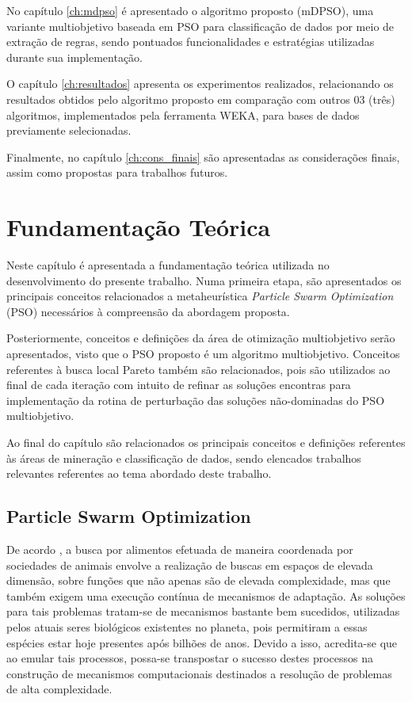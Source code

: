 \documentclass[
	12pt,				%
	openany,			%
	oneside,	
	a4paper,			%
	brazil,				%
	]{unimontes-ppgmsc-abntex2}
\begin{document}
No capítulo \ref{ch:mdpso} é apresentado o algoritmo proposto (mDPSO), uma variante multiobjetivo baseada em PSO para classificação de dados por meio de extração de regras, sendo pontuados funcionalidades e estratégias utilizadas durante sua implementação.

O capítulo \ref{ch:resultados} apresenta os experimentos realizados, relacionando os resultados obtidos pelo algoritmo proposto em comparação com outros 03 (três) algoritmos, implementados pela ferramenta WEKA, para bases de dados previamente selecionadas.

Finalmente, no capítulo \ref{ch:cons_finais} são apresentadas as considerações finais, assim como propostas para trabalhos futuros.


\chapter{Fundamentação Teórica}
\label{ch:ref_teorico}

Neste capítulo é apresentada a fundamentação teórica utilizada no desenvolvimento do presente trabalho. Numa primeira etapa, são apresentados os principais conceitos relacionados a metaheurística {\em Particle Swarm Optimization} (PSO) necessários à compreensão da abordagem proposta. 

Posteriormente, conceitos e definições da área de otimização multiobjetivo serão apresentados, visto que o PSO proposto é um algoritmo multiobjetivo. Conceitos referentes à busca local Pareto também são relacionados, pois são utilizados ao final de cada iteração com intuito de refinar as soluções encontras para implementação da rotina de perturbação das soluções não-dominadas do PSO multiobjetivo. 

Ao final do capítulo são relacionados os principais conceitos e definições referentes às áreas de mineração e classificação de dados, sendo elencados trabalhos relevantes referentes ao tema abordado deste trabalho.


\section{Particle Swarm Optimization}
\label{ch:pso}

De acordo , a busca por alimentos efetuada de maneira coordenada por sociedades de animais envolve a realização de buscas em espaços de elevada dimensão, sobre funções que não apenas são de elevada complexidade, mas que também exigem uma execução contínua de mecanismos de adaptação. As soluções para tais problemas tratam-se de mecanismos bastante bem sucedidos, utilizadas pelos atuais seres biológicos existentes no planeta, pois permitiram a essas espécies estar hoje presentes após bilhões de anos. Devido a isso, acredita-se que ao emular tais processos, possa-se transpostar o sucesso destes processos na construção de mecanismos computacionais destinados a resolução de problemas de alta complexidade.
 
\end{document}
